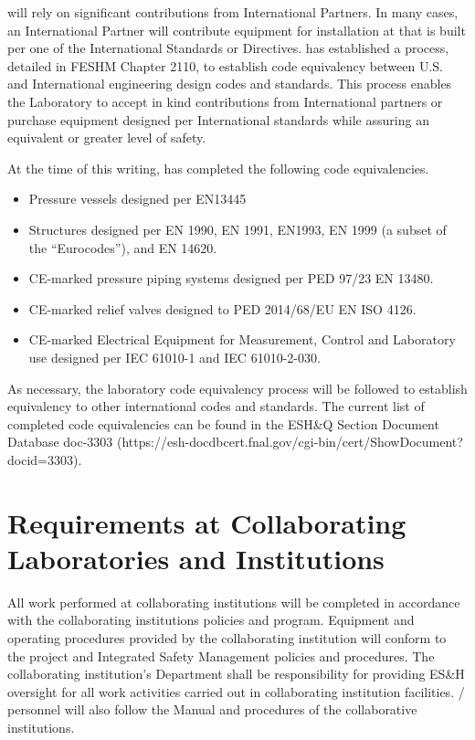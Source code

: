  will rely on significant contributions from International
Partners. In many cases, an International Partner will contribute
equipment for installation at \fnal that is built per one of the
International Standards or Directives. \fnal has established a
process, detailed in FESHM Chapter 2110, to establish code equivalency
between U.S. and International engineering design codes and
standards. This process enables the Laboratory to accept in kind
contributions from International partners or purchase equipment
designed per International standards while assuring an equivalent or
greater level of safety.

At the time of this writing, \fnal has completed the following code
equivalencies.
\begin{itemize}
 \item Pressure vessels designed per EN13445
 \item Structures designed per EN 1990, EN 1991, EN1993, EN 1999 (a
   subset of the ``Eurocodes''), and EN 14620.
 \item CE-marked pressure piping systems designed per PED 97/23 EN 13480.
 \item CE-marked relief valves designed to PED 2014/68/EU EN ISO 4126.
 \item CE-marked Electrical Equipment for Measurement, Control and
   Laboratory use designed per IEC 61010-1 and IEC 61010-2-030.
\end{itemize}

As necessary, the laboratory code equivalency process will be followed
to establish equivalency to other international codes and
standards. The current list of completed code equivalencies can be
found in the ESH\&Q Section Document Database doc-3303
(https://esh-docdbcert.fnal.gov/cgi-bin/cert/ShowDocument?docid=3303).

\section{ Requirements at Collaborating Laboratories and Institutions}

All work performed at collaborating institutions will be completed in
accordance with the collaborating institutions 
policies and program. Equipment and operating procedures
provided by the collaborating institution will conform to the 
project  and Integrated Safety Management policies and
procedures. The collaborating institution's  Department shall be
responsibility for providing ES\&H oversight for all work activities
carried out in collaborating institution facilities. /
personnel will also follow the  Manual and procedures of the
collaborative institutions.

